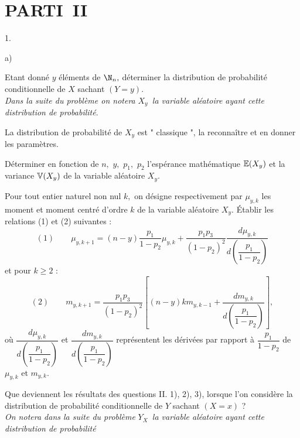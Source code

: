 \documentclass[11pt]{article}%
\begin{document}
\section*{PARTI\E\ II}

\begin{noliste}{1.}
 \setlength{\itemsep}{4mm}
\item 

\begin{noliste}{a)}
 \setlength{\itemsep}{2mm}
\item Etant donné $y$ éléments de $\N_{n},$ déterminer la
distribution de probabilité conditionnelle de $X$ sachant $(Y = y).$\\
\textit{Dans la suite du problème on notera }$X_{y}$\textit{\ la
variable aléatoire ayant cette distribution de probabilité}.

\item La distribution de probabilité de $X_{y}$ est " classique ", la
reconnaître et en donner les paramètres.
\end{noliste}

\item Déterminer en fonction de $n,$ $y,$ $p_{1},$ $p_{2}$ l'espérance
mathématique $\mathbb{E}(X_{y})$ et la variance $\mathbb{V}(X_{y})$ de la variable
aléatoire $X_{y}.
$

\item Pour tout entier naturel non nul $k,$ on désigne respectivement
par $\mu_{y,k}$ les moment et moment centré d'ordre $k$ de la variable
aléatoire 
$X_{y}.$ Établir les relations (1) et (2) suivantes :
\[
(1)\qquad \mu_{y,k + 1} = (n-y)\dfrac{p_{1}}{1-p_{2}}\mu_{y,k} +
\dfrac{p_{1}p_{3}}{(1-p_{2})^{2}}\dfrac{d\mu_{y,k}}{d\left(
\dfrac{p_{1}}{1-p_{2}}\right) }
\]
et pour $k\geq 2$ :
\[
(2)\qquad m_{y,k + 1} = \dfrac{p_{1}p_{3}}{(1-p_{2})^{2}}\left[
(n-y)km_{y,k-1} + \dfrac{dm_{y,k}}{d\left(
\dfrac{p_{1}}{1-p_{2}}\right) }\right],
\]
où $\dfrac{d\mu_{y,k}}{d\left( \dfrac{p_{1}}{1-p_{2}}\right) }$ et
$\dfrac{dm_{y,k}}{d\left( \dfrac{p_{1}}{1-p_{2}}\right) }$ représentent
les dérivées
par rapport à $\dfrac{p_{1}}{1-p_{2}}$ de $\mu_{y,k}$ et $m_{y,k}.$

\item Que deviennent les résultats des questions II. 1), 2), 3),
lorsque
l'on considère la distribution de probabilité conditionnelle de $Y$
sachant $(X = x)$ ?\\
\textit{On notera dans la suite du problème }$Y_{X}$\textit{\ la
variable aléatoire ayant cette distribution de probabilité}
\end{noliste}
\end{document}
